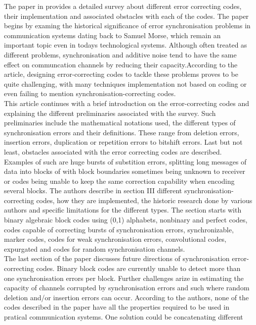 \documentclass[12pt]%
{article}
\begin{document}
The paper in \cite{mercier2010survey} provides a detailed survey about different error correcting codes, their implementation
and associated obstacles with each of the codes. The paper begins by examing the historical significance of error synchronisation problems in
communication systems dating back to Samuel Morse, which remain an important topic even in todays technological systems. Although often treated as
different problems, synchronisation and additive noise tend to have the same effect on communcation channels by reducing their capacity.According to the 
article, designing error-correcting codes to tackle these problems proves to be quite challenging, with many techniques implementation not based on coding or even 
failing to mention synchronisation-correcting codes. \\
 This article continues with a brief introduction on the error-correcting codes and explaining the 
different preliminaries associated with the survey. Such preliminaries include the mathematical notations used, the different types of synchronisation errors and their definitions.
These range from deletion errors, insertion errors, duplication or repetition errors to bitshift errors. Last but not least, obstacles associated with the 
error correcting codes are described. Examples of such are huge bursts of substition errors, splitting long messages of data into blocks of with block boundaries
sometimes being unknown to receiver or codes being unable to keep the same correction capability when encoding several blocks. The authors describe in section III different 
synchronisation-correcting codes, how they are implemented, the historic research done by various authors and specific limitations for the different types. The section starts
with binary algebraic block codes using (0,1) alphabets, nonbinary and perfect codes, codes capable of correcting bursts of synchronisation errors, synchronizable, marker codes, codes for weak
synchronisation errors, convolutional codes, expurgated and codes for random synchronisation channels. \\
The last section of the paper discusses future directions of synchronisation error-correcting codes. Binary block codes are currently unable to detect more than one synchronisation
errors per block. Further challenges arize in estimating the capacity of channels corrupted by synchronisation errors and such where random deletion and/or insertion errors can occur.
According to the authors, none of the codes described in the paper have all the properties required to be used in pratical communication systems. One solution could be concatenating different
\end{document}
